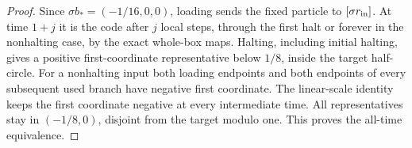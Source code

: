 \begin{proof}
Since $\sigma b_*=(-1/16,0,0)$, loading sends the fixed particle to
$[\sigma r_{\rm in}]$.  At time $1+j$ it is the code after $j$ local
steps, through the first halt or forever in the nonhalting case, by the
exact whole-box maps.  Halting, including initial halting, gives a
positive first-coordinate representative below $1/8$, inside the target
half-circle.  For a nonhalting input both loading endpoints and both
endpoints of every subsequent used branch have negative first coordinate.
The linear-scale identity keeps the first coordinate negative at every
intermediate time.  All representatives stay in $(-1/8,0)$, disjoint
from the target modulo one.  This proves the all-time equivalence.
\end{proof}
